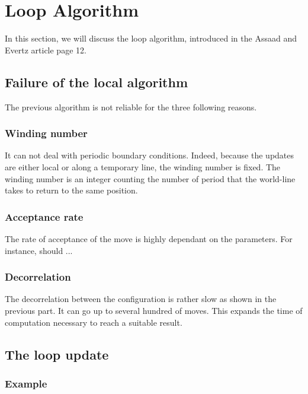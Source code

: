 \documentclass[a4paper,12pt,twoside]{article}
\begin{document}
	\newpage
	\section{Loop Algorithm}
	In this section, we will discuss the loop algorithm, introduced in the Assaad and Evertz article page 12. 
	
	\subsection{Failure of the local algorithm}
	The previous algorithm is not reliable for the three following reasons.
	
	\subsubsection{Winding number}
	It can not deal with periodic boundary conditions. Indeed, because the updates are either local or along a temporary line, the winding number is fixed. The winding number is an integer counting the number of period that the world-line takes to return to the same position.

	\subsubsection{Acceptance rate} The rate of acceptance of the move is highly dependant on the parameters. For instance, should ...
	
	\subsubsection{Decorrelation} The decorrelation between the configuration is rather slow as shown in the previous part. It can go up to several hundred of moves. This expands the time of computation necessary to reach a suitable result. 

	\subsection{The loop update}
	
	\subsubsection{Example}
	
\end{document}
